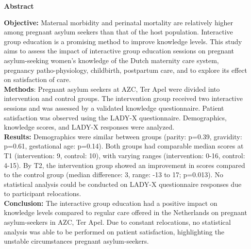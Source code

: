 \documentclass[12pt]{article}
\begin{document}
\centerline{\textbf{ }}
\newpage

\centerline{\textbf{Abstract}}

\noindent \textbf{Objective: }Maternal morbidity and perinatal mortality are relatively higher among pregnant asylum seekers than that of the host population. Interactive group education is a promising method to improve knowledge levels. This study aims to assess the impact of interactive group education sessions on pregnant asylum-seeking women's knowledge of the Dutch maternity care system, pregnancy patho-physiology, childbirth, postpartum care, and to explore its effect on satisfaction of care.\\
\noindent \textbf{Methods}: Pregnant asylum seekers at AZC, Ter Apel were divided into intervention and control groups. The intervention group received two interactive sessions and was assessed by a validated knowledge questionnaire. Patient satisfaction was observed using the LADY-X questionnaire. Demographics, knowledge scores, and LADY-X responses were analyzed.\\
\noindent \textbf{Results:} Demographics were similar between groups (parity: p=0.39, gravidity: p=0.61, gestational age: p=0.14). Both groups had comparable median scores at T1 (intervention: 9, control: 10), with varying ranges (intervention: 0-16, control: 4-15). By T2, the intervention group showed an improvement in scores compared to the control group (median difference: 3, range: -13 to 17; p=0.013). No statistical analysis could be conducted on LADY-X questionnaire responses due to participant relocations.\\
\noindent \textbf{Conclusion: }The interactive group education had a positive impact on knowledge levels compared to regular care offered in the Netherlands on pregnant asylum-seekers in AZC, Ter Apel. Due to constant relocations, no statistical analysis was able to be performed on patient satisfaction, highlighting the unstable circumstances pregnant asylum-seekers. \\
\end{document}
